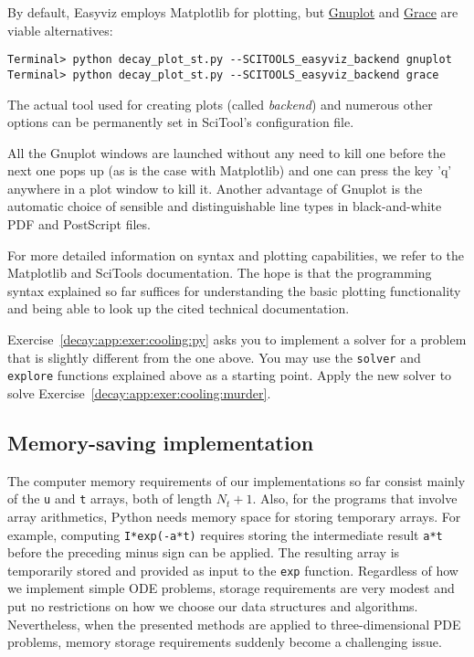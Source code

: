 \documentclass[graybox,sectrefs,envcountresetchap,open=right,final]{svmonodo}
\newenvironment{question_mdfboxadmon}[1][]{
\begin{question_mdfboxmdframed}[frametitle=#1]
}
{
\end{question_mdfboxmdframed}
}
\begin{document}
By default, Easyviz employs Matplotlib for plotting, but \href{{http://www.gnuplot.info/}}{Gnuplot} and \href{{http://plasma-gate.weizmann.ac.il/Grace/}}{Grace} are viable alternatives:

\begin{Verbatim}[frame=lines,label=\fbox{{\tiny Terminal}},framesep=2.5mm,framerule=0.7pt,fontsize=\fontsize{9pt}{9pt}]
Terminal> python decay_plot_st.py --SCITOOLS_easyviz_backend gnuplot
Terminal> python decay_plot_st.py --SCITOOLS_easyviz_backend grace
\end{Verbatim}
The actual tool used for creating plots (called \emph{backend})
and numerous other options
can be permanently set in SciTool's configuration file.

All the Gnuplot windows are launched without any need to kill one before
the next one pops up (as is the case with Matplotlib) and one can
press the key 'q' anywhere in a plot window to kill it.
Another advantage of Gnuplot is the automatic choice of sensible
and distinguishable line types in black-and-white PDF and PostScript
files.

For more detailed information on syntax and plotting capabilities,
we refer to the Matplotlib \cite{Matplotlib:doc}
and SciTools \cite{SciTools:doc} documentation.
The hope is that
the programming syntax explained so far suffices for understanding the
basic plotting functionality and being able to look up
the cited technical documentation.


\begin{question_mdfboxadmon}
Exercise~\ref{decay:app:exer:cooling:py} asks you to implement
a solver for a problem that is slightly different from the
one above. You may use the \texttt{solver} and \texttt{explore} functions
explained above as a starting point. Apply the new solver
to solve Exercise~\ref{decay:app:exer:cooling:murder}.
\end{question_mdfboxadmon}





\subsection{Memory-saving implementation}

The computer memory requirements of our implementations so far consist
mainly of the \texttt{u} and \texttt{t} arrays, both of length $N_t+1$.  Also, for
the programs that involve array arithmetics, Python needs memory space
for storing temporary arrays. For example, computing \texttt{I*exp(-a*t)}
requires storing the intermediate result \texttt{a*t} before the preceding
minus sign can be applied. The resulting array is temporarily stored
and provided as input to the \texttt{exp} function.  Regardless of how we
implement simple ODE problems, storage requirements are very modest
and put no restrictions on how we choose our data structures and
algorithms.  Nevertheless, when the presented methods are applied to
three-dimensional PDE problems, memory storage requirements suddenly
become a challenging issue.
\end{document}
